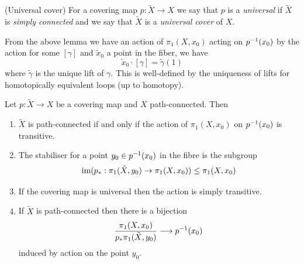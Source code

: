 \documentclass{article}
\begin{document}
\begin{definition}
	(Universal cover) For a covering map $ p:\tilde X\to X $ we say that $ p $ is a \textit{universal} if $ \tilde X $ is \textit{simply connected} and we say that $ \tilde X $ is a \textit{universal cover} of $ X $.
\end{definition}
From the above lemma we have an action of $ \pi_1(X,x_0) $ acting on $ {p}^{-1}(x_0) $ by the action for some $ [\gamma] $ and $ \tilde x_0 $ a point in the fiber, we have
\[
	\tilde x_0 \cdot [\gamma] = \tilde \gamma(1)
\]
where $ \tilde \gamma $ is the unique lift of $ \gamma $. This is well-defined by the uniqueness of lifts for homotopically equivalent loops (up to homotopy).
\begin{lemma}
  Let $ p:\tilde X\to X $ be a covering map and $ X $ path-connected. Then
  \begin{enumerate}
	  \item $ \tilde X $ is path-connected if and only if the action of $ \pi_1(X,x_0) $ on $ {p}^{-1}(x_0) $ is transitive.  
	  \item The stabiliser for a point $ y_0\in {p}^{-1}(x_0) $ in the fibre is the subgroup
		  \[
		    \operatorname{im}(p_*: \pi_1(\tilde X,y_0) \to \pi_1(X,x_0))\le \pi_1(X,x_0)
		  \]
\item If the covering map is universal then the action is simply transitive.

	  \item If $ \tilde X $ is path-connected then there is a bijection
		  \[
			  \frac{\pi_1(X,x_0)}{p_*\pi_1(\tilde X,y_0)} \longrightarrow {p}^{-1}(x_0)
		  \]
		  induced by action on the point $ y_0 $.
  \end{enumerate}
\end{lemma}
\pf \ 
\end{document}
